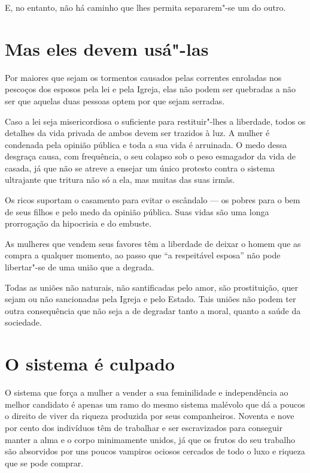 E, no entanto, não há caminho que lhes permita separarem"-se um do outro.

\section{Mas eles devem usá"-las}

Por maiores que sejam os tormentos causados pelas correntes
enroladas nos pescoços dos esposos pela lei e pela Igreja, elas não podem ser quebradas
a não ser que aquelas duas pessoas optem por que sejam serradas.

Caso a lei seja misericordiosa o suficiente para restituir"-lhes a liberdade,
todos os detalhes da vida privada de ambos devem ser
trazidos à luz. A mulher é condenada pela opinião pública e toda a sua
vida é arruinada. O medo dessa desgraça causa, com frequência, o
seu colapso sob o peso esmagador da vida de casada, já que não se atreve
a ensejar um único protesto contra o sistema ultrajante que tritura não
só a ela, mas muitas das suas irmãs.

Os ricos suportam o casamento para evitar o escândalo --- os pobres para
o bem de seus filhos e pelo medo da opinião pública. Suas vidas são uma
longa prorrogação da hipocrisia e do embuste.

As mulheres que vendem seus favores têm a liberdade de deixar o homem
que as compra a qualquer momento, ao passo que ``a respeitável esposa''
não pode libertar"-se de uma união que a degrada.

Todas as uniões não naturais, não santificadas pelo amor, são
prostituição, quer sejam ou não sancionadas pela Igreja e pelo Estado.
Tais uniões não podem ter outra consequência que não seja a de degradar
tanto a moral, quanto a saúde da sociedade.

\section{O sistema é culpado}

O sistema que força a mulher a vender a sua feminilidade e independência
ao melhor candidato é apenas um ramo do mesmo sistema malévolo que dá a poucos
o direito de viver da riqueza produzida por seus companheiros. Noventa e
nove por cento dos indivíduos têm de trabalhar e ser escravizados para
conseguir manter a alma e o corpo minimamente unidos, já que os frutos
do seu trabalho são absorvidos por uns poucos vampiros ociosos cercados
de todo o luxo e riqueza que se pode comprar.

